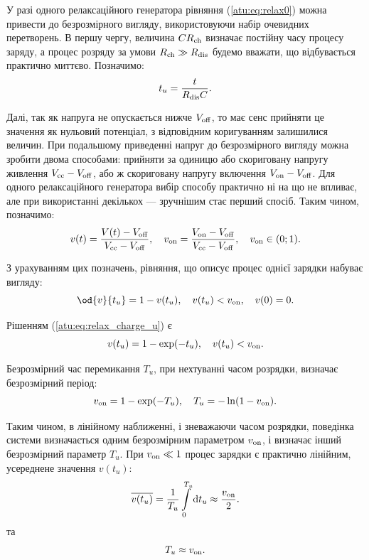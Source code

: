 У разі одного релаксаційного генератора рівняння (\ref{atu:eq:relax0})
можна привести до безрозмірного вигляду, використовуючи набір
очевидних перетворень. В першу чергу, величина
$ C R _\mathrm{ch} $ визначає постійну часу процесу заряду, а процес
розряду за умови
$ R _\mathrm{ch} \gg R _\mathrm{dis} $ будемо вважати, що відбувається практично
миттєво. Позначимо:
%
\begin{equation}
  t_u = \frac{t}{R_\mathrm{dis} C} .
  \label{atu:eq:t_u_relax}
\end{equation}

Далі, так як напруга не опускається нижче
$ V _\mathrm{off} $, то має сенс прийняти це значення як нульовий потенціал,
з відповідним коригуванням залишилися величин. При подальшому
приведенні напруг до безрозмірного вигляду можна зробити двома
способами: прийняти за одиницю або скориговану напругу живлення
$ V _\mathrm{cc} -V _\mathrm{off} $, або ж скориговану напругу включення
$ V _\mathrm{on} -V _\mathrm{off} $. Для одного релаксаційного генератора вибір
способу практично ні на що не впливає, але при використанні
декількох --- зручнішим стає перший спосіб. Таким чином,
позначимо:
%
\begin{equation}
  v(t) = \frac{V(t)-V_\mathrm{off}}{V_\mathrm{cc}-V_\mathrm{off}},
  \quad
  v_\mathrm{on} = \frac{V_\mathrm{on}-V_\mathrm{off}}{V_\mathrm{cc}-V_\mathrm{off}},
  \quad
  v_\mathrm{on} \in ( 0; 1 ).
  \label{atu:eq:v_u_relax}
\end{equation}

З урахуванням цих позначень, рівняння, що описує процес однієї
зарядки набуває вигляду:
%
\begin{equation}
  \od{v}{t_u} = 1 - v( t_u ),
  \quad
  v( t_u ) < v\Tidx{on},
  \quad
  v(0) = 0.
  \label{atu:eq:relax_charge_u}
\end{equation}

Рішенням (\ref{atu:eq:relax_charge_u}) є
%
\begin{equation}
  v(t_u) = 1 - \exp( - t_u ) ,
  \quad
  v( t_u ) < v_\mathrm{on}.
  \label{atu:eq:relax_charge_u_solu}
\end{equation}

Безрозмірний час перемикання
$ T_u $, при нехтуванні часом розрядки, визначає безрозмірний
період:
%
\begin{equation}
  v_\mathrm{on} = 1 - \exp( - T_u ),
  \quad
  T_u = - \ln ( 1 - v_\mathrm{on} ).
  \label{atu:eq:T_u_relax}
\end{equation}

Таким чином, в лінійному наближенні, і зневажаючи часом
розрядки, поведінка системи визначається одним безрозмірним
параметром
$ v _\mathrm{on} $, і визначає інший безрозмірний параметр
$ T_u $. При
$ v _\mathrm{on} \ll 1 $ процес зарядки є практично лінійним, усереднене значення
$ v (t_u) $:
%
\begin{equation}
  \overline{v(t_u)} =
  \frac{1}{T_u}\int\limits_{0}^{T_u} \mathrm{d}t_u
  \approx
  \frac{v_\mathrm{on}}{ 2 }.
  \label{atu:eq:av_lin_relax}
\end{equation}
%
та
%
\begin{equation}
  T_u
  \approx
  v_\mathrm{on}.
  \label{atu:eq:T_u_lin_relax}
\end{equation}

